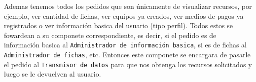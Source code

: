 Ademas tenemos todos los pedidos que son únicamente de visualizar recursos, por ejemplo, ver cantidad de fichas, ver equipos ya creados, ver medios de pagos ya registrados o ver información basica del usuario (tipo perfil). Todos estos se fowardean a su componete correspondiente, es decir, si el pedido es de información basica al \texttt{Administrador de información basica}, si es de fichas al \texttt{Administrador de fichas}, etc. Entonces este componete se encargara de pasarle el pedido al \texttt{Transmisor de datos} para que nos obtenga los recursos solicitados y luego se le devuelven al usuario.
